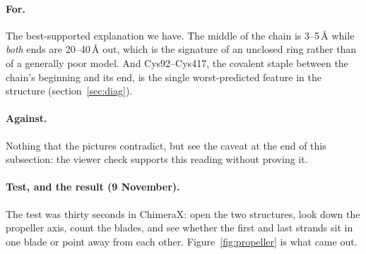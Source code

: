 \documentclass[11pt,a4paper]{article}
\begin{document}
\paragraph{For.} The best-supported explanation we have. The middle of the chain
is 3--5\,\AA{} while \emph{both} ends are 20--40\,\AA{} out, which is the
signature of an unclosed ring rather than of a generally poor model. And
Cys92--Cys417, the covalent staple between the chain's beginning and its end, is
the single worst-predicted feature in the structure (section~\ref{sec:diag}).

\paragraph{Against.} Nothing that the pictures contradict, but see the caveat
at the end of this subsection: the viewer check supports this reading without
proving it.

\paragraph{Test, and the result (9 November).} The test was thirty seconds in
ChimeraX: open the two structures, look down the propeller axis, count the
blades, and see whether the first and last strands sit in one blade or point away
from each other. Figure~\ref{fig:propeller} is what came out.
\end{document}
